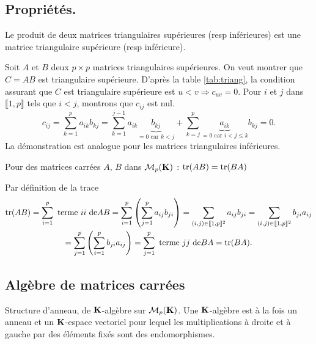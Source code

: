 \subsection{Propriétés.}
\begin{prop}
Le produit de deux matrices triangulaires supérieures (resp inférieures) est une matrice triangulaire supérieure (resp inférieure).   
\end{prop}
\begin{demo}
  Soit $A$ et $B$ deux $p\times p$ matrices triangulaires supérieures. On veut montrer que $C = AB$ est triangulaire supérieure. D'après la table \ref{tab:triang}, la condition assurant que $C$ est triangulaire supérieure est $ u < v \Rightarrow c_{u v} = 0$.\newline
  Pour $i$ et $j$ dans $\llbracket 1,p \rrbracket$ tels que $i<j$, montrons que $c_{i j}$ est nul.
\[
 c_{i j} = \sum_{k=1}^{p}a_{i k} b_{k j}
  = \sum_{k=1}^{j-1}a_{i k} \underset{= 0 \text{ car } k < j}{\underbrace{b_{k j}}} + \sum_{k=j}^{p}\underset{= 0 \text{ car } i<j\leq k}{\underbrace{a_{i k}}} b_{k j} = 0.
\]
La démonstration est analogue pour les matrices triangulaires inférieures.
\end{demo}

\begin{prop} Pour des matrices carrées $A$, $B$ dans $\mathcal{M}_p(\mathbf{K})$ :
 $\mathop{\mathrm{tr}} (AB)=\mathop{\mathrm{tr}} (BA)$
\end{prop}
\begin{demo}
Par définition de la trace 
\begin{multline*}
 \mathop{\mathrm{tr}}(AB) = \sum_{i=1}^{p}\text{ terme $i i$ de}AB
 = \sum_{i=1}^{p} \left( \sum_{j=1}^{p}a_{i j} b_{j i}\right) 
 = \sum_{(i,j)\in \llbracket 1,p \rrbracket^2} a_{i j} b_{j i}
 = \sum_{(i,j)\in \llbracket 1,p \rrbracket^2} b_{j i} a_{i j} \\
 = \sum_{j=1}^{p} \left( \sum_{i=1}^{p} b_{j i}a_{i j}\right)
 =\sum_{j=1}^{p}\text{ terme $j j$ de} BA
 =\mathop{\mathrm{tr}}(BA).
\end{multline*}
\end{demo}

\subsection{Algèbre de matrices carrées}

Structure d'anneau, de $\mathbf{K}$-algèbre sur $\mathcal M_{p}(\mathbf{K})$. Une $\mathbf{K}$-algèbre est à la fois un anneau et un $\mathbf{K}$-espace vectoriel pour lequel les multiplications à droite et à gauche par des éléments fixés sont des endomorphismes.

